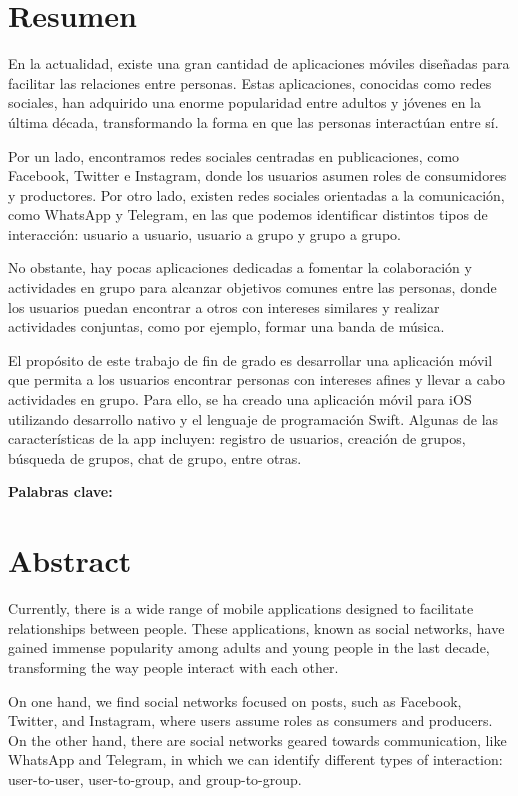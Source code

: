\documentclass{book}
\begin{document}
\begingroup
\chapter{Resumen}
En la actualidad, existe una gran cantidad de aplicaciones 
móviles diseñadas para facilitar las relaciones entre personas. 
Estas aplicaciones, conocidas como redes sociales, han adquirido 
una enorme popularidad entre adultos y jóvenes en la última década, 
transformando la forma en que las personas interactúan entre sí.

Por un lado, encontramos redes sociales centradas en publicaciones, 
como Facebook, Twitter e Instagram, donde los usuarios asumen roles 
de consumidores y productores. Por otro lado, existen redes sociales 
orientadas a la comunicación, como WhatsApp y Telegram, en las que 
podemos identificar distintos tipos de interacción: usuario a usuario, 
usuario a grupo y grupo a grupo.

No obstante, hay pocas aplicaciones dedicadas a fomentar la colaboración 
y actividades en grupo para alcanzar objetivos comunes entre las personas, 
donde los usuarios puedan encontrar a otros con intereses similares y 
realizar actividades conjuntas, como por ejemplo, formar una banda de música.

El propósito de este trabajo de fin de grado es desarrollar una 
aplicación móvil que permita a los usuarios encontrar personas con 
intereses afines y llevar a cabo actividades en grupo. Para ello, 
se ha creado una aplicación móvil para iOS utilizando desarrollo 
nativo y el lenguaje de programación Swift. Algunas de las características 
de la app incluyen: registro de usuarios, creación de grupos, búsqueda de 
grupos, chat de grupo, entre otras.

\textbf{\large Palabras clave:}

\chapter{Abstract}
Currently, there is a wide range of mobile applications designed to facilitate 
relationships between people. These applications, known as social networks, 
have gained immense popularity among adults and young people in the last decade, 
transforming the way people interact with each other.

On one hand, we find social networks focused on posts, such as Facebook, 
Twitter, and Instagram, where users assume roles as consumers and producers. 
On the other hand, there are social networks geared towards communication, 
like WhatsApp and Telegram, in which we can identify different types of 
interaction: user-to-user, user-to-group, and group-to-group.
\end{document}
